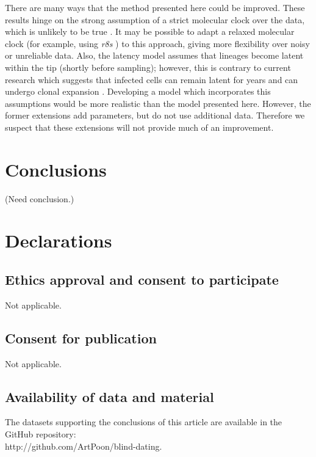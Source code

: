 \documentclass[12pt]{article}
\begin{document}
There are many ways that the method presented here could be improved.
These results hinge on the strong assumption of a strict molecular clock over the data, which is unlikely to be true \cite{Shankarappa99}. 
It may be possible to adapt a relaxed molecular clock (for example, using \textit{r8s} \cite{r8ts}) to this approach, giving more flexibility over noisy or unreliable data.
Also, the latency model assumes that lineages become latent within the tip (shortly before sampling); however, this is contrary to current research which suggests that infected cells can remain latent for years and can undergo clonal expansion \cite{Maldarelli14}.
Developing a model which incorporates this assumptions
would be more realistic than the model presented here.
However, the former extensions add parameters, but do not use additional data.
Therefore we suspect that these extensions will not provide much of an improvement.



\section * {Conclusions} \label{sec:concl}
(Need conclusion.)

\section * {Declarations} \label{sec:decl}
\subsection*{Ethics approval and consent to participate}
Not applicable.

\subsection*{Consent for publication}
Not applicable.

\subsection*{Availability of data and material}
The datasets supporting the conclusions of this article are available in the GitHub repository: \\ \mbox{http://github.com/ArtPoon/blind-dating}.
\end{document}
